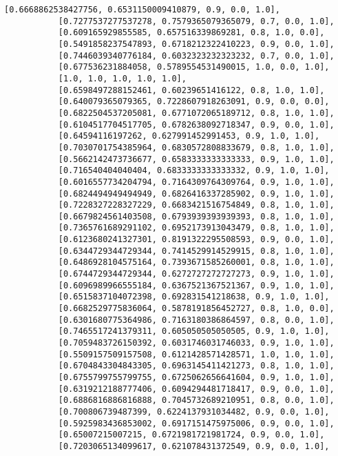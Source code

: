 \documentclass[11pt]{article}
\begin{document}
\begin{Verbatim}[commandchars=\\\{\}]
           [0.6668862538427756, 0.6531150009410879, 0.9, 0.0, 1.0],
           [0.7277537277537278, 0.7579365079365079, 0.7, 0.0, 1.0],
           [0.609165929855585, 0.657516339869281, 0.8, 1.0, 0.0],
           [0.5491858237547893, 0.6718212322410223, 0.9, 0.0, 1.0],
           [0.7446039340776184, 0.6032323232323232, 0.7, 0.0, 1.0],
           [0.677536231884058, 0.5789554531490015, 1.0, 0.0, 1.0],
           [1.0, 1.0, 1.0, 1.0, 1.0],
           [0.6598497288152461, 0.60239651416122, 0.8, 1.0, 1.0],
           [0.640079365079365, 0.7228607918263091, 0.9, 0.0, 0.0],
           [0.6822504537205081, 0.6771072065189712, 0.8, 1.0, 1.0],
           [0.6104517704517705, 0.6782638092718347, 0.9, 0.0, 1.0],
           [0.64594116197262, 0.627991452991453, 0.9, 1.0, 1.0],
           [0.7030701754385964, 0.6830572808833679, 0.8, 1.0, 1.0],
           [0.5662142473736677, 0.6583333333333333, 0.9, 1.0, 1.0],
           [0.716540404040404, 0.6833333333333332, 0.9, 1.0, 1.0],
           [0.6016557734204794, 0.7164309764309764, 0.9, 1.0, 1.0],
           [0.6824494949494949, 0.6826416337285902, 0.9, 1.0, 1.0],
           [0.7228327228327229, 0.6683421516754849, 0.8, 1.0, 1.0],
           [0.6679824561403508, 0.6793939393939393, 0.8, 1.0, 1.0],
           [0.7365761689291102, 0.6952173913043479, 0.8, 1.0, 1.0],
           [0.6123680241327301, 0.8191322295508593, 0.9, 0.0, 1.0],
           [0.6344729344729344, 0.7414529914529915, 0.8, 1.0, 1.0],
           [0.6486928104575164, 0.7393671585260001, 0.8, 1.0, 1.0],
           [0.6744729344729344, 0.6272727272727273, 0.9, 1.0, 1.0],
           [0.6096989966555184, 0.6367521367521367, 0.9, 1.0, 1.0],
           [0.6515837104072398, 0.692831541218638, 0.9, 1.0, 1.0],
           [0.6682529775836064, 0.5878191856452727, 0.8, 1.0, 0.0],
           [0.6301680775364986, 0.7163180386864597, 0.8, 0.0, 1.0],
           [0.7465517241379311, 0.605050505050505, 0.9, 1.0, 1.0],
           [0.7059483726150392, 0.6031746031746033, 0.9, 1.0, 1.0],
           [0.5509157509157508, 0.6121428571428571, 1.0, 1.0, 1.0],
           [0.6704843304843305, 0.6963145411421273, 0.8, 1.0, 1.0],
           [0.6755799755799755, 0.6725062656641604, 0.9, 1.0, 1.0],
           [0.6319212188777406, 0.6094294481718417, 0.9, 0.0, 1.0],
           [0.6886816886816888, 0.7045732689210951, 0.8, 0.0, 1.0],
           [0.700806739487399, 0.6224137931034482, 0.9, 0.0, 1.0],
           [0.5925983436853002, 0.6917151475975006, 0.9, 0.0, 1.0],
           [0.65007215007215, 0.6721981721981724, 0.9, 0.0, 1.0],
           [0.7203065134099617, 0.621078431372549, 0.9, 0.0, 1.0],

\end{Verbatim}
\end{document}
